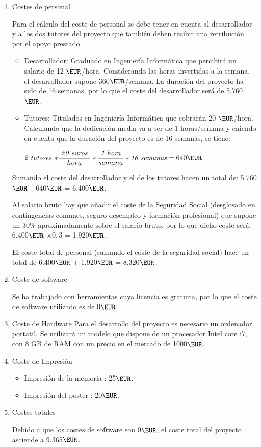 \begin{enumerate}

\item Costes de personal

Para el cálculo del coste de personal se debe tener en cuenta al desarrollador y a los dos tutores del proyecto que también deben recibir una retribución por el apoyo prestado.

\begin{itemize}
\item Desarrollador: Graduado en Ingeniería Informática que percibirá un salario de 12 $\EUR$/hora. Considerando las horas invertidas a la semana, el desarrollador supone 360$\EUR$/semana. La duración del proyecto ha sido de 16 semanas, por lo que el coste del desarrollador será de 5.760$\EUR$.
\item Tutores: Titulados en Ingeniería Informática que cobrarán 20 $\EUR$/hora. Calculando que la dedicación media va a ser de 1 horas/semana y eniendo en cuenta que la duración del proyecto es de 16 semanas, se tiene:

\textit{2 tutores }$ * \dfrac{\textit{ 20 euros } }{hora}*\dfrac{\textit{1 hora}}{semana}*\textit{16 semanas}=640 \EUR $

\end{itemize}

Sumando el coste del desarrollador y el de los tutores hacen un total de:
5.760$\EUR$ +640$\EUR$ = 6.400$\EUR$.

Al salario bruto hay que añadir el coste de la Seguridad Social (desglosado en contingencias comunes, seguro desempleo y formación profesional) que supone un 30$\%$ aproximadamente sobre
el salario bruto, por lo que dicho coste será: 6.400$\EUR$ $\times 0,3$ = 1.920$\EUR$.

El coste total de personal (sumando el coste de la seguridad social) hace un total de 6.400$\EUR$ + 1.920$\EUR$ = 8.320$\EUR$.

\item Coste de software

Se ha trabajado con herramientas cuya licencia es gratuita, por lo que el coste de software utilizado es de 0$\EUR$.

\item Coste de Hardware
Para el desarrollo del proyecto es necesario un ordenador portatil. Se utilizará un modelo que dispone de un procesador Intel core i7, con 8 GB de RAM con
un precio en el mercado de 1000$\EUR$.

\item Coste de Impresión
\begin{itemize}
\item Impresión de la memoria : 25$\EUR$.
\item Impresión del poster : 20$\EUR$.
\end{itemize}

\item Costes totales

Debido a que los costes de software son 0$\EUR$, el coste total del proyecto asciende a 9.365$\EUR$.
\end{enumerate}


